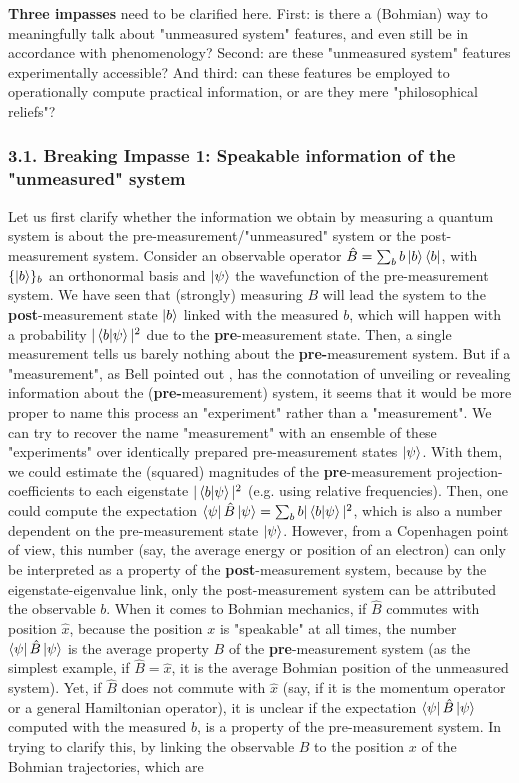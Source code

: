 \documentclass[11pt, a4paper]{article} %
\begin{document}
{\bf Three impasses} need to be clarified here. First: is there a (Bohmian) way to meaningfully talk about "unmeasured system" features, and even still be in accordance with phenomenology? Second: are these "unmeasured system" features experimentally accessible? And third: can these features be employed to operationally compute practical information, or are they mere "philosophical reliefs"?\vspace{-0.2cm}

\subsubsection*{3.1. Breaking Impasse 1: Speakable information of the "unmeasured" system}\vspace{-0.1cm}

Let us first clarify whether the information we obtain by measuring a quantum system is about the pre-measurement/"unmeasured" system or the post-measurement system. Consider an observable operator $\hat{B}=\sum_b b\ket{b}\bra{b}$, with $\{\ket{b}\}_b$ an orthonormal basis and $\ket{\psi}$ the wavefunction of the pre-measurement system. We have seen that (strongly) measuring $B$ will lead the system to the {\bf post}-measurement state $\ket{b}$ linked with the measured $b$, which will happen with a probability $|\bra{b}\ket{\psi}|^2$ due to the {\bf pre}-measurement state. Then, a single measurement tells us barely nothing about the {\bf pre-}measurement system. But if a "measurement", as Bell pointed out \cite{Bell}, has the connotation of unveiling or revealing information about the ({\bf pre-}measurement) system, it seems that it would be more proper to name this process an "experiment" rather than a "measurement". We can try to recover the name "measurement" with an ensemble of these "experiments" over identically prepared pre-measurement states $\ket{\psi}$. With them, we could estimate the (squared) magnitudes of the {\bf pre}-measurement projection-coefficients to each eigenstate $|\bra{b}\ket{\psi}|^2$ (e.g. using relative frequencies). Then, one could compute the expectation $\bra{\psi} \hat B \ket{\psi}=\sum_b b |\bra{b}\ket{\psi}|^2$, which is also a number dependent on the pre-measurement state $\ket{\psi}$. However, from a Copenhagen point of view, this number (say, the average energy or position of an electron) can only be interpreted as a property of the {\bf post}-measurement system, because by the eigenstate-eigenvalue link, only the post-measurement system can be attributed the observable $b$. When it comes to Bohmian mechanics, if $\hat{B}$ commutes with position $\hat{x}$, because the position $x$ is "speakable" at all times, the number $\bra{\psi} \hat B \ket{\psi}$ is the average property $B$ of the {\bf pre}-measurement system (as the simplest example, if $\hat{B}=\hat{x}$, it is the average Bohmian position of the unmeasured system). Yet, if $\hat{B}$ does not commute with $\hat{x}$ (say, if it is the momentum operator or a general Hamiltonian operator), it is unclear if the expectation $\bra{\psi} \hat B \ket{\psi}$ computed with the measured $b$, is a property of the pre-measurement system. In trying to clarify this, by linking the observable $B$ to the position $x$ of the Bohmian trajectories, which are 
\end{document}

